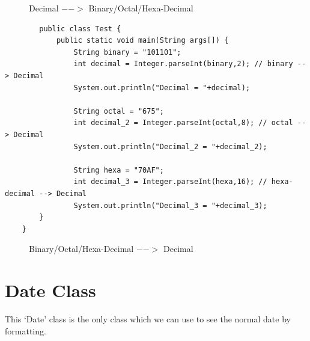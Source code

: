 \documentclass[openany]{book}  %
\begin{document}
% 
\begin{figure}[htbp]
    \begin{center}
        \caption{Decimal $-->$ Binary/Octal/Hexa-Decimal}
    \end{center}
\end{figure}
\begin{center}
    \begin{verbatim}
        public class Test {
            public static void main(String args[]) {
                String binary = "101101";
                int decimal = Integer.parseInt(binary,2); // binary --> Decimal
                System.out.println("Decimal = "+decimal);
        
                String octal = "675";
                int decimal_2 = Integer.parseInt(octal,8); // octal --> Decimal
                System.out.println("Decimal_2 = "+decimal_2);
        
                String hexa = "70AF";
                int decimal_3 = Integer.parseInt(hexa,16); // hexa-decimal --> Decimal
                System.out.println("Decimal_3 = "+decimal_3);
        }
    }
    \end{verbatim}
\end{center}
% 
% 
\begin{figure}[htbp]
    \begin{center}
        \caption{Binary/Octal/Hexa-Decimal $-->$ Decimal}
    \end{center}
\end{figure}
% 
% 
\section{Date Class}
This `Date' class is the only class which we can use to see the normal date
by formatting.
% 
% 
\end{document}
